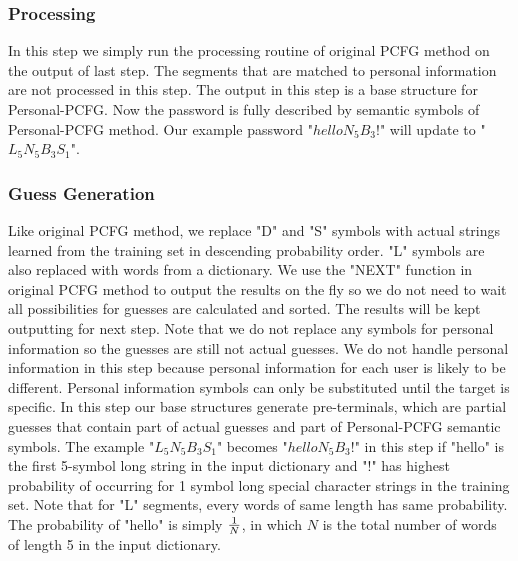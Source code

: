 \subsubsection{Processing}
In this step we simply run the processing routine of original PCFG method on the output of last step. The segments that are matched to personal information are not processed in this step. The output in this step is a base structure for Personal-PCFG. Now the password is fully described by semantic symbols of Personal-PCFG method. Our example password "$helloN_5B_3!$" will update to "$L_5N_5B_3S_1$". 
\subsubsection{Guess Generation}
Like original PCFG method, we replace "D" and "S" symbols with actual strings learned from the training set in descending probability order. "L" symbols are also replaced with words from a dictionary. We use the "NEXT" function \cite{weir2009password} in original PCFG method to output the results on the fly so we do not need to wait all possibilities for guesses are calculated and sorted. The results will be kept outputting for next step. Note that we do not replace any symbols for personal information so the guesses are still not actual guesses. We do not handle personal information in this step because personal information for each user is likely to be different. Personal information symbols can only be substituted until the target is specific. In this step our base structures generate pre-terminals, which are partial guesses that contain part of actual guesses and part of Personal-PCFG semantic symbols. The example "$L_5N_5B_3S_1$" becomes "$helloN_5B_3!$" in this step if "hello" is the first 5-symbol long string in the input dictionary and "!" has highest probability of occurring for 1 symbol long special character strings in the training set. Note that for "L" segments, every words of same length has same probability. The probability of "hello" is simply $1\over N$, in which $N$ is the total number of words of length 5 in the input dictionary. 

